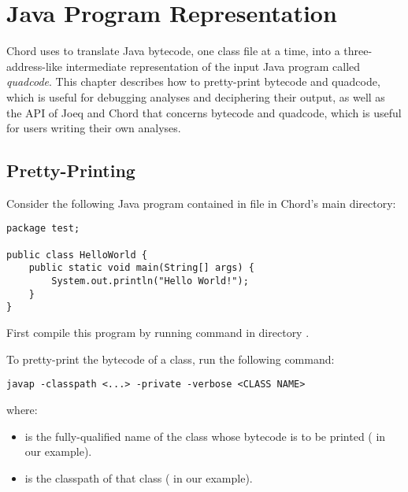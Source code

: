 \chapter{Java Program Representation}
\label{chap:program-representation}

Chord uses  to translate
Java bytecode, one class file at a time, into a three-address-like
intermediate representation of the input Java program called {\it
quadcode}.  This chapter describes how to pretty-print bytecode and
quadcode, which is useful for debugging analyses and deciphering their
output, as well as the API of Joeq and Chord that concerns bytecode
and quadcode, which is useful for users writing their own analyses.

\section{Pretty-Printing}

Consider the following Java program contained in
file  in Chord's
main directory:
\begin{framed}
\begin{verbatim}
package test;

public class HelloWorld {
    public static void main(String[] args) {
        System.out.println("Hello World!");
    }
}
\end{verbatim}
\end{framed}

First compile this program by running command  in
directory .

To pretty-print the bytecode of a class, run the following command:
\begin{framed}
\begin{verbatim}
javap -classpath <...> -private -verbose <CLASS NAME>
\end{verbatim}
\end{framed}

where:

\begin{itemize}
\item
{\tt <CLASS NAME>} is the fully-qualified name of the class whose
bytecode is to be printed ( in our example).
\item
{} is the classpath of that class ( in our example).
\end{itemize}

